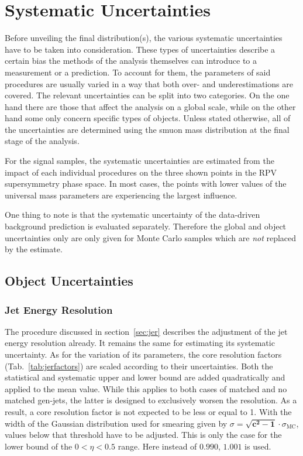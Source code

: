\chapter{Systematic Uncertainties}
\label{cha:systematics}

Before unveiling the final distribution(s), the various systematic uncertainties have to be taken into consideration. These types of uncertainties describe a certain bias the methods of the analysis themselves can introduce to a measurement or a prediction. To account for them, the parameters of said procedures are usually varied in a way that both over- and underestimations are covered. The relevant uncertainties can be split into two categories. On the one hand there are those that affect the analysis on a global scale, while on the other hand some only concern specific types of objects. Unless stated otherwise, all of the uncertainties are determined using the smuon mass distribution at the final stage of the analysis.

For the signal samples, the systematic uncertainties are estimated from the impact of each individual procedures on the three shown points in the RPV supersymmetry phase space. In most cases, the points with lower values of the universal mass parameters are experiencing the largest influence. 

One thing to note is that the systematic uncertainty of the data-driven background prediction is evaluated separately. Therefore the global and object uncertainties only are only given for Monte Carlo samples which are \textit{not} replaced by the estimate.

\section{Object Uncertainties}
\label{sec:objsys}

\subsection{Jet Energy Resolution}
\label{sec:jersys}

The procedure discussed in section~\ref{sec:jer} describes the adjustment of the jet energy resolution already. It remains the same for estimating its systematic uncertainty. As for the variation of its parameters, the core resolution factors (Tab.~\ref{tab:jerfactors}) are scaled according to their uncertainties. Both the statistical and systematic upper and lower bound are added quadratically and applied to the mean value. While this applies to both cases of matched and no matched gen-jets, the latter is designed to exclusively worsen the resolution. As a result, a core resolution factor is not expected to be less or equal to 1. With the width of the Gaussian distribution used for smearing given by $\sigma = \mathbf{\sqrt{c^2-1}} \cdot \sigma_{\text{MC}}$, values below that threshold have to be adjusted. This is only the case for the lower bound of the $0 < \eta < 0.5$ range. Here instead of $0.990$, $1.001$ is used. 

